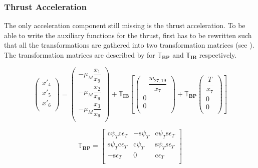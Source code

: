 \subsubsection{Thrust Acceleration}
\label{subsubsec:tsiThrust}
The only acceleration component still missing is the thrust acceleration. To be able to write the auxiliary functions for the thrust,  first has to be rewritten such that all the transformations are gathered into two transformation matrices (see ). The transformation matrices are described by  for $\mathbb{T}_{\mathbf{BP}}$ and $\mathbb{T}_{\mathbf{IB}}$ respectively.

\begin{equation} \label{eq:accAux}
\begin{pmatrix}
x'_{4}\\
x'_{5}\\
x'_{6}\\
\end{pmatrix}
=
\begin{pmatrix}
-\mu_{M}\dfrac{x_{1}}{x_{9}}\\
-\mu_{M}\dfrac{x_{2}}{x_{9}}\\
-\mu_{M}\dfrac{x_{3}}{x_{9}}\\
\end{pmatrix}+
\mathbb{T}_{\mathbf{IB}}\left[
\begin{pmatrix}
-\dfrac{w_{27,19}}{x_{7}}\\
0\\
0\\
\end{pmatrix}
+ 
\mathbb{T}_{\mathbf{BP}}
\begin{pmatrix}
\dfrac{T}{x_{7}}\\
0\\
0\\
\end{pmatrix}
\right]
\end{equation}


\begin{equation} \label{eq:BPtrans}
\mathbb{T}_{\mathbf{BP}}=
\begin{bmatrix}
\text{c}\psi_{T}\text{c}\epsilon_{T} & -\text{s}\psi_{T} & \text{c}\psi_{T}\text{s}\epsilon_{T}\\
\text{s}\psi_{T}\text{c}\epsilon_{T} & \text{c}\psi_{T} & \text{s}\psi_{T}\text{s}\epsilon_{T}\\
-\text{s}\epsilon_{T} & 0 & \text{c}\epsilon_{T}\\
\end{bmatrix}
\end{equation}

